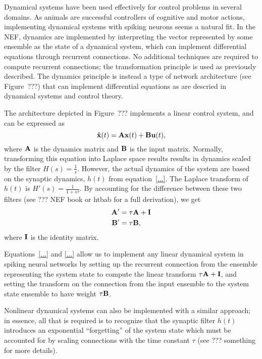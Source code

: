 {Dynamical systems have been used effectively
for control problems in several domains.
As animals are successful controllers
of cognitive and motor actions,
implementing dynamical systems
with spiking neurons seems a natural fit.
In the NEF, dynamics are implemented
by interpreting the vector
represented by some ensemble as
the state of a dynamical system,
which can implement differential equations
through recurrent connections.
No additional techniques are required
to compute recurrent connections;
the transformation principle
is used as previously described.
The dynamics principle
is instead a type of network architecture
(see Figure~???) that can
implement differential equations
as are descried in dynamical systems
and control theory.


The architecture depicted in Figure~???
implements a linear control system,
and can be expressed as
\begin{equation}
  \mathbf{\dot{x}}(t) = \mathbf{Ax}(t) + \mathbf{Bu}(t),
\end{equation}
where $\mathbf{A}$ is the dynamics matrix
and $\mathbf{B}$ is the input matrix.
Normally, transforming this equation
into Laplace space results
results in dynamics scaled by
the filter $H(s) = \frac{1}{s}$.
However, the actual dynamics of the system
are based on the synaptic dynamics,
$h(t)$ from equation~\eqref{...}.
The Laplace transform of $h(t)$ is
$H'(s) = \frac{1}{1 + s\tau}$.
By accounting for the difference
between these two filters
(see ??? NEF book or htbab
for a full derivation),
we get
\begin{align}
  \mathbf{A'} &= \tau \mathbf{A} + \mathbf{I} \\
  \mathbf{B'} &= \tau \mathbf{B},
\end{align}
where $\mathbf{I}$ is the identity matrix.

Equations~\eqref{...} and \eqref{...}
allow us to implement any linear dynamical system
in spiking neural networks
by setting up the recurrent connection
from the ensemble representing the system state
to compute the linear transform $\tau \mathbf{A} + \mathbf{I}$,
and setting the transform on the connection
from the input ensemble
to the system state ensemble
to have weight $\tau \mathbf{B}$.

Nonlinear dynamical systems can also be implemented
with a similar approach;
in essence, all that is required is to
recognize that the synaptic filter $h(t)$
introduces an exponential ``forgetting''
of the system state
which must be accounted for by scaling
connections with the time constant $\tau$
(see ??? something for more details).

}
